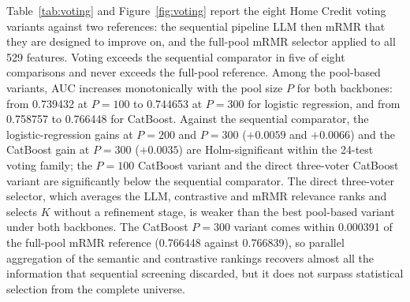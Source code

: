 \documentclass[preprint,12pt]{elsarticle}
\newcommand{\Kfeat}{K}
\begin{document}
Table~\ref{tab:voting} and Figure~\ref{fig:voting} report the eight Home Credit voting variants against two references: the sequential pipeline LLM then mRMR that they are designed to improve on, and the full-pool mRMR selector applied to all 529 features. Voting exceeds the sequential comparator in five of eight comparisons and never exceeds the full-pool reference. Among the pool-based variants, AUC increases monotonically with the pool size $P$ for both backbones: from 0.739432 at $P=100$ to 0.744653 at $P=300$ for logistic regression, and from 0.758757 to 0.766448 for CatBoost. Against the sequential comparator, the logistic-regression gains at $P=200$ and $P=300$ ($+0.0059$ and $+0.0066$) and the CatBoost gain at $P=300$ ($+0.0035$) are Holm-significant within the 24-test voting family; the $P=100$ CatBoost variant and the direct three-voter CatBoost variant are significantly below the sequential comparator. The direct three-voter selector, which averages the LLM, contrastive and mRMR relevance ranks and selects $\Kfeat$ without a refinement stage, is weaker than the best pool-based variant under both backbones. The CatBoost $P=300$ variant comes within 0.000391 of the full-pool mRMR reference (0.766448 against 0.766839), so parallel aggregation of the semantic and contrastive rankings recovers almost all the information that sequential screening discarded, but it does not surpass statistical selection from the complete universe.
\end{document}
